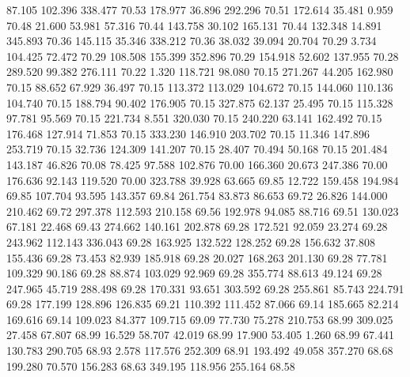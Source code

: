   87.105  102.396  338.477        70.53
 178.977   36.896  292.296        70.51
 172.614   35.481    0.959        70.48
  21.600   53.981   57.316        70.44
 143.758   30.102  165.131        70.44
 132.348   14.891  345.893        70.36
 145.115   35.346  338.212        70.36
  38.032   39.094   20.704        70.29
   3.734  104.425   72.472        70.29
 108.508  155.399  352.896        70.29
 154.918   52.602  137.955        70.28
 289.520   99.382  276.111        70.22
   1.320  118.721   98.080        70.15
 271.267   44.205  162.980        70.15
  88.652   67.929   36.497        70.15
 113.372  113.029  104.672        70.15
 144.060  110.136  104.740        70.15
 188.794   90.402  176.905        70.15
 327.875   62.137   25.495        70.15
 115.328   97.781   95.569        70.15
 221.734    8.551  320.030        70.15
 240.220   63.141  162.492        70.15
 176.468  127.914   71.853        70.15
 333.230  146.910  203.702        70.15
  11.346  147.896  253.719        70.15
  32.736  124.309  141.207        70.15
  28.407   70.494   50.168        70.15
 201.484  143.187   46.826        70.08
  78.425   97.588  102.876        70.00
 166.360   20.673  247.386        70.00
 176.636   92.143  119.520        70.00
 323.788   39.928   63.665        69.85
  12.722  159.458  194.984        69.85
 107.704   93.595  143.357        69.84
 261.754   83.873   86.653        69.72
  26.826  144.000  210.462        69.72
 297.378  112.593  210.158        69.56
 192.978   94.085   88.716        69.51
 130.023   67.181   22.468        69.43
 274.662  140.161  202.878        69.28
 172.521   92.059   23.274        69.28
 243.962  112.143  336.043        69.28
 163.925  132.522  128.252        69.28
 156.632   37.808  155.436        69.28
  73.453   82.939  185.918        69.28
  20.027  168.263  201.130        69.28
  77.781  109.329   90.186        69.28
  88.874  103.029   92.969        69.28
 355.774   88.613   49.124        69.28
 247.965   45.719  288.498        69.28
 170.331   93.651  303.592        69.28
 255.861   85.743  224.791        69.28
 177.199  128.896  126.835        69.21
 110.392  111.452   87.066        69.14
 185.665   82.214  169.616        69.14
 109.023   84.377  109.715        69.09
  77.730   75.278  210.753        68.99
 309.025   27.458   67.807        68.99
  16.529   58.707   42.019        68.99
  17.900   53.405    1.260        68.99
  67.441  130.783  290.705        68.93
   2.578  117.576  252.309        68.91
 193.492   49.058  357.270        68.68
 199.280   70.570  156.283        68.63
 349.195  118.956  255.164        68.58

